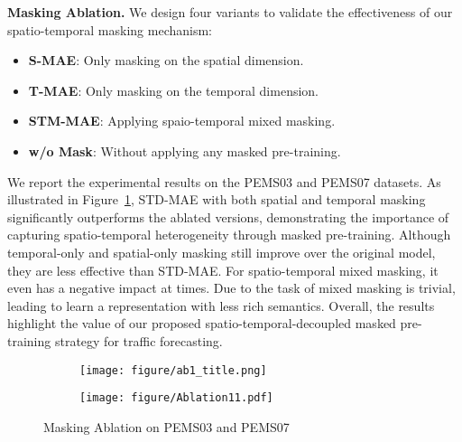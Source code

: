 \documentclass[letterpaper]{article} \usepackage{aaai24}  \usepackage{times}  \usepackage{helvet}  \usepackage{courier}  \usepackage[hyphens]{url}  \usepackage{graphicx} \urlstyle{rm} \def\UrlFont{\rm}  \usepackage{natbib}  \usepackage{caption} \frenchspacing  \setlength{\pdfpagewidth}{8.5in} \setlength{\pdfpageheight}{11in} \usepackage{algorithm}
\begin{document}
\noindent\textbf{Masking Ablation.}
We design four variants to validate the effectiveness of our spatio-temporal masking mechanism:
\begin{itemize}
  \item \textbf{S-MAE}: Only masking on the spatial dimension.
  \item \textbf{T-MAE}: Only masking on the temporal dimension.
  \item \textbf{STM-MAE}: Applying spaio-temporal mixed masking.
  \item \textbf{w/o Mask}: Without applying any masked pre-training.
\end{itemize}  
We report the experimental results on the PEMS03 and PEMS07 datasets. As illustrated in Figure~\ref{fig:ablation1}, STD-MAE with both spatial and temporal masking significantly outperforms the ablated versions, demonstrating the importance of capturing spatio-temporal heterogeneity through masked pre-training. Although temporal-only and spatial-only masking still improve over the original model, they are less effective than STD-MAE. For spatio-temporal mixed masking, it even has a negative impact at times. Due to the task of mixed masking is trivial, leading to learn a representation with less rich semantics. Overall, the results highlight the value of our proposed spatio-temporal-decoupled masked pre-training strategy for traffic forecasting.
\captionsetup{justification=raggedright,singlelinecheck=false}
\begin{figure}[h]
  \centering
    \begin{subfigure}{0.95\linewidth}
    \texttt{[image: figure/ab1\_title.png]}
  \end{subfigure}
     \begin{subfigure}{0.95\linewidth}
    \texttt{[image: figure/Ablation11.pdf]}
  \end{subfigure}
\captionsetup{justification=centering}
  \caption{Masking Ablation on PEMS03 and PEMS07}
  \label{fig:ablation1}
\end{figure}
\end{document}
